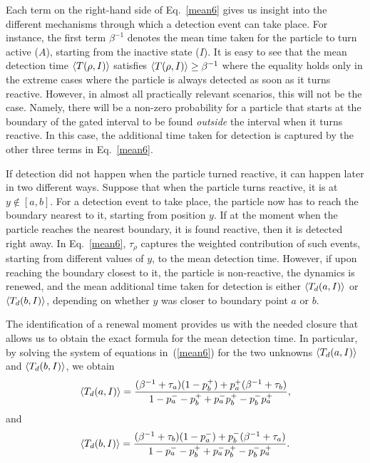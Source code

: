 Each term on the right-hand side of Eq.~\eqref{mean6} gives us insight into the different mechanisms through which a detection event can take place. For instance, the first term $\beta^{-1}$ denotes the mean time taken for the particle to turn active ($A$), starting from the inactive state ($I$). It is easy to see that the mean detection time $\Braket{T(\rho, I)}$ satisfies $\Braket{T(\rho, I)} \geq \beta^{-1}$ where the equality holds only in the extreme cases where the particle is always detected as soon as it turns reactive. However, in almost all practically relevant scenarios, this will not be the case. Namely, there will be a non-zero probability for a particle that starts at the boundary of the gated interval to be found \emph{outside} the interval when it turns reactive. In this case, the additional time taken for detection is captured by the other three terms in Eq.~\eqref{mean6}. 

If detection did not happen when the particle turned reactive, it can happen later in two different ways. Suppose that when the particle turns reactive, it is at $y \notin [a,b]$. For a detection event to take place, the particle now has to reach the boundary nearest to it, starting from position $y$. If at the moment when the particle reaches the nearest boundary, it is found reactive, then it is detected right away. In Eq.~\eqref{mean6}, $\tau_{\rho}$ captures the weighted contribution of such events, starting from different values of $y$, to the mean detection time. However, if upon reaching the boundary closest to it, the particle is non-reactive, the dynamics is renewed, and the mean additional time taken for detection is either $\Braket{T_d(a, I)}$ or $\Braket{T_d(b, I)}$, depending on whether $y$ was closer to boundary point $a$ or $b$. 

The identification of a renewal moment provides us with the needed closure that allows us to obtain the exact formula for the mean detection time. In particular, by solving the system of equations in~(\ref{mean6}) for the two unknowns $\Braket{T_d(a, I)}$ and $\Braket{T_d(b,I)}$, we obtain
%
\begin{equation}\label{mean9}
  \Braket{T_d(a, I)}    = \frac{(\beta^{-1}+\tau_a)(1-p^{+}_{b}) + p^{+}_{a} (\beta^{-1}+\tau_b)}{1 - p^{-}_{a} - p^{+}_{b} + p^{-}_{a} p^{+}_{b} - p^{-}_{b} p^{+}_{a} }, 
\end{equation} 
%
\noindent and
%
\begin{equation}\label{mean10}
\Braket{T_d(b, I)}    =
  \frac{(\beta^{-1}+\tau_b)(1-p^{-}_{a}) + p^{-}_{b} (\beta^{-1}+\tau_a)}{1 - p^{-}_{a} - p^{+}_{b} + p^{-}_{a} p^{+}_{b} - p^{-}_{b} p^{+}_{a} }. 
\end{equation} 
%

